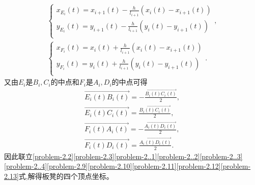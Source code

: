 \documentclass{cumcmthesis}
\begin{document}
    \begin{gather}
    \begin{cases}
    x_{E_i}\left( t \right) =x_{i+1}\left( t \right) -\frac{h}{l_{i+1}}\left( x_i\left( t \right) -x_{i+1}\left( t \right) \right)\\
    y_{E_i}\left( t \right) =y_{i+1}\left( t \right) -\frac{h}{l_{i+1}}\left( y_i\left( t \right) -y_{i+1}\left( t \right) \right)\\
    \end{cases},\label{problem-2.9}
    \\
    \begin{cases}
    x_{F_i}\left( t \right) =x_i\left( t \right) +\frac{h}{l_{i+1}}\left( x_i\left( t \right) -x_{i+1}\left( t \right) \right)\\
    y_{F_i}\left( t \right) =y_i\left( t \right) +\frac{h}{l_{i+1}}\left( y_i\left( t \right) -y_{i+1}\left( t \right) \right)\\
    \end{cases}.\label{problem-2.10}
    \end{gather}
    又由$E_i$是$B_i,C_{i}$的中点和$F_i$是$A_i,D_i$的中点可得
    \begin{gather}
    \overrightarrow{E_i\left( t \right) B_i\left( t \right) }=-\frac{\overrightarrow{B_i\left( t \right) C_i\left( t \right) }}{2},\label{problem-2.11}
    \\
    \overrightarrow{E_i\left( t \right) C_i\left( t \right) }=\frac{\overrightarrow{B_i\left( t \right) C_i\left( t \right) }}{2},\label{problem-2.12}
    \\
    \overrightarrow{F_i\left( t \right) A_i\left( t \right) }=-\frac{\overrightarrow{A_i\left( t \right) D_i\left( t \right) }}{2},\label{problem-2.13}
    \\
    \overrightarrow{F_i\left( t \right) D_i\left( t \right) }=\frac{\overrightarrow{A_i\left( t \right) D_i\left( t \right) }}{2}.   \label{problem-2.14} 
    \end{gather}
    因此联立\eqref{problem-2.2}\eqref{problem-2.3}\eqref{problem-2..1}\eqref{problem-2..2}\eqref{problem-2..3}\eqref{problem-2..4}\eqref{problem-2.9}\eqref{problem-2.10}\eqref{problem-2.11}\eqref{problem-2.12}\eqref{problem-2.13}式,解得板凳的四个顶点坐标。
\end{document}
